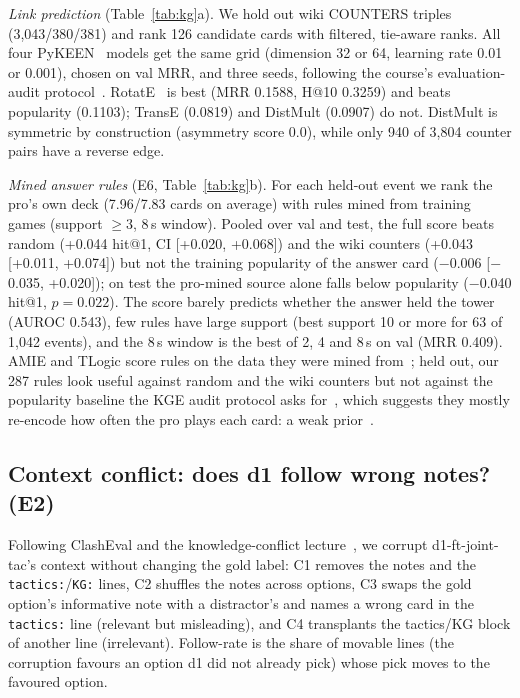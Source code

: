 \documentclass[conference]{IEEEtran}
\newcommand{\tw}[1]{\texttt{#1}}
\begin{document}
\emph{Link prediction} (Table~\ref{tab:kg}a). We hold out wiki COUNTERS triples (3,043/380/381) and rank 126 candidate cards with filtered, tie-aware ranks. All four PyKEEN~\cite{ali2021pykeen} models get the same grid (dimension 32 or 64, learning rate 0.01 or 0.001), chosen on val MRR, and three seeds, following the course's evaluation-audit protocol~\cite{ruffinelli2020olddog,sun2020reevaluation,cap6938L05}. RotatE~\cite{sun2019rotate} is best (MRR 0.1588, H@10 0.3259) and beats popularity (0.1103); TransE (0.0819) and DistMult (0.0907) do not. DistMult is symmetric by construction (asymmetry score 0.0), while only 940 of 3,804 counter pairs have a reverse edge. %

\emph{Mined answer rules} (E6, Table~\ref{tab:kg}b). For each held-out event we rank the pro's own deck (7.96/7.83 cards on average) with rules mined from training games (support $\ge3$, 8\,s window). Pooled over val and test, the full score beats random (+0.044 hit@1, CI [+0.020, +0.068]) and the wiki counters (+0.043 [+0.011, +0.074]) but not the training popularity of the answer card ($-$0.006 [$-$0.035, +0.020]); on test the pro-mined source alone falls below popularity ($-$0.040 hit@1, $p=0.022$). The score barely predicts whether the answer held the tower (AUROC 0.543), few rules have large support (best support 10 or more for 63 of 1,042 events), and the 8\,s window is the best of 2, 4 and 8\,s on val (MRR 0.409). AMIE and TLogic score rules on the data they were mined from~\cite{lajus2020amie3,liu2022tlogic}; held out, our 287 rules look useful against random and the wiki counters but not against the popularity baseline the KGE audit protocol asks for~\cite{ruffinelli2020olddog}, which suggests they mostly re-encode how often the pro plays each card: a weak prior~\cite{cap6938L07}. %

\subsection{Context conflict: does d1 follow wrong notes? (E2)}
\label{sec:conflict}

Following ClashEval and the knowledge-conflict lecture~\cite{wu2024clasheval,xie2024chameleon,lim2026l17}, we corrupt d1-ft-joint-tac's context without changing the gold label: C1 removes the notes and the \tw{tactics:}/\tw{KG:} lines, C2 shuffles the notes across options, C3 swaps the gold option's informative note with a distractor's and names a wrong card in the \tw{tactics:} line (relevant but misleading), and C4 transplants the tactics/KG block of another line (irrelevant). Follow-rate is the share of movable lines (the corruption favours an option d1 did not already pick) whose pick moves to the favoured option.
\end{document}
